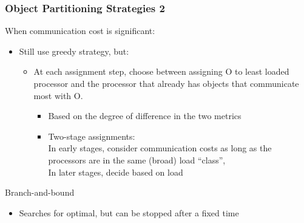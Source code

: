 \begin{frame}[fragile]
 \frametitle{Object Partitioning Strategies 2}
 When communication cost is significant:
 \begin{itemize}
  \item Still use greedy strategy, but:
  \begin{itemize}
   \item At each assignment step, choose between assigning O to least loaded processor and the processor that already has objects that communicate most with O.
   \begin{itemize}
   \item Based on the degree of difference in the two metrics
   \item Two-stage assignments:\\
     In early stages,  consider communication costs as long as the processors are
     in the same (broad) load “class”,\\
     In later stages, decide based on load
   \end{itemize}
  \end{itemize}
 \end{itemize}
 Branch-and-bound
 \begin{itemize}
  \item Searches for optimal, but can be stopped after a fixed time
 \end{itemize}
\end{frame}

